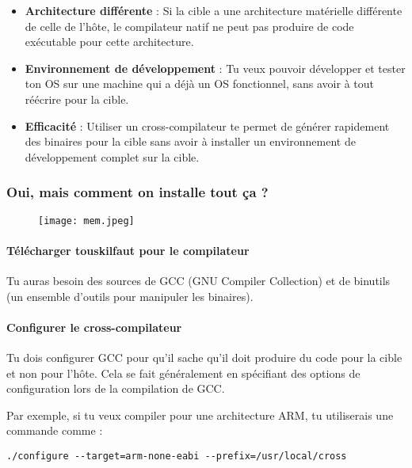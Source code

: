 \documentclass{article}
\begin{document}
\begin{itemize}
    \item \textbf{Architecture différente} : Si la cible a une architecture matérielle différente de celle de l'hôte, le compilateur natif ne peut pas produire de code exécutable pour cette architecture.
    
    \item \textbf{Environnement de développement} : Tu veux pouvoir développer et tester ton OS sur une machine qui a déjà un OS fonctionnel, sans avoir à tout réécrire pour la cible.
    
    \item \textbf{Efficacité} : Utiliser un cross-compilateur te permet de générer rapidement des binaires pour la cible sans avoir à installer un environnement de développement complet sur la cible.
\end{itemize}

\subsubsection{Oui, mais comment on installe tout ça ?}

\begin{figure}[h!]
    \centering
    \texttt{[image: mem.jpeg]}
    \label{fig:logo1}
\end{figure}

\paragraph{Télécharger touskilfaut pour le compilateur}
Tu auras besoin des sources de GCC (GNU Compiler Collection) et de binutils (un ensemble d'outils pour manipuler les binaires).

\paragraph{Configurer le cross-compilateur}
Tu dois configurer GCC pour qu'il sache qu'il doit produire du code pour la cible et non pour l'hôte. Cela se fait généralement en spécifiant des options de configuration lors de la compilation de GCC.

Par exemple, si tu veux compiler pour une architecture ARM, tu utiliserais une commande comme :

\begin{lstlisting}
./configure --target=arm-none-eabi --prefix=/usr/local/cross
\end{lstlisting}
\end{document}

